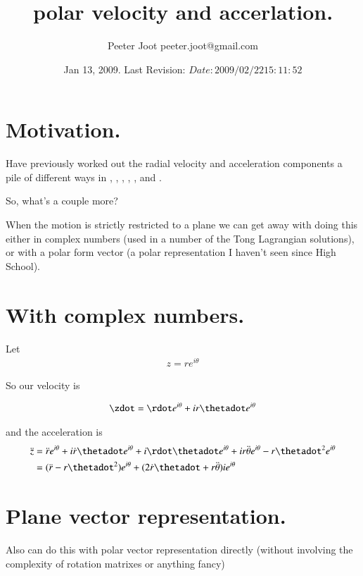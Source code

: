 \documentclass{article}
\title{ polar velocity and accerlation. }
\author{Peeter Joot \quad peeter.joot@gmail.com}
\date{ Jan 13, 2009.  Last Revision: $Date: 2009/02/22 15:11:52 $ }
\begin{document}
\maketitle{}

\section{ Motivation. }

Have previously worked out the radial velocity and acceleration components a pile of different ways in
\cite{PJAngAcc}, 
\cite{PJAngAccCross}, 
\cite{PJAngVel}, 
\cite{PJKeRot}, 
\cite{PJRadialDer}, and
\cite{PJUnitDer}.

So, what's a couple more?

When the motion is strictly restricted to a plane we can get away with doing this either in complex numbers
(used in a number of the Tong Lagrangian solutions), or with a polar form  vector (a polar representation
I haven't seen since High School).

\section{ With complex numbers. }

Let
\begin{align*}
z = r e^{i\theta}
\end{align*}

So our velocity is

\begin{align*}
\zdot = \rdot e^{i\theta} + i r \thetadot e^{i\theta}
\end{align*}

and the acceleration is
\begin{align*}
\ddot{z}
&= \ddot{r} e^{i\theta} + i \dot{r} \thetadot e^{i\theta}
 + i \rdot \thetadot e^{i\theta}
 + i r \ddot{\theta} e^{i\theta}
 - r \thetadot^2 e^{i\theta} \\
&= (\ddot{r} - r \thetadot^2 ) e^{i\theta} + (2 \dot{r} \thetadot + r \ddot{\theta} ) i e^{i\theta}
\end{align*}

\section{ Plane vector representation. }

Also can do this with polar vector representation directly (without involving the complexity of rotation matrixes or anything fancy)
\end{document}
